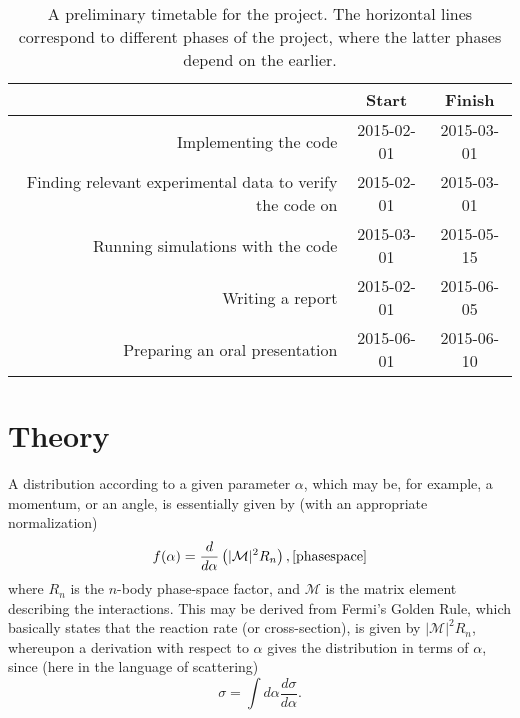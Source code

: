 \documentclass[12pt, a4paper]{article}
\newcommand{\me}{\ensuremath{\mathcal{M}}}
\begin{document}
\begin{table}
\centering
\caption{\label{timetable} A preliminary timetable for the project. The horizontal lines correspond to different phases of the project, where the latter phases depend on the earlier.}
\begin{tabular}{r|c|c}\hline\hline
& Start & Finish \\\hline
Implementing the code & 2015-02-01 & 2015-03-01 \\
Finding relevant experimental data to verify the code on & 2015-02-01 & 2015-03-01 \\\hline
Running simulations with the code & 2015-03-01 & 2015-05-15 \\
Writing a report &  2015-02-01 & 2015-06-05 \\\hline
Preparing an oral presentation  &  2015-06-01 & 2015-06-10 \\\hline\hline
\end{tabular}
\end{table}



\section{Theory}
\label{t}
A distribution according to a given parameter $\alpha$, which may be, for example, a momentum, or an angle, is essentially given by (with an appropriate normalization)
\begin{equation}
f(\alpha) =\frac{d}{d\alpha} \left(|\me|^2 R_n\right), \cite{phasespace}\label{dist}
\end{equation}
where $R_n$ is the $n$-body phase-space factor, and $\me$ is the matrix element describing the interactions. This may be derived from Fermi's Golden Rule, which basically states that the reaction rate (or cross-section), is given by $|\me|^2 R_n$, whereupon a derivation with respect to $\alpha$ gives the distribution in terms of $\alpha$, since (here in the language of scattering)
\begin{equation}
\sigma = \int d\alpha \frac{d\sigma}{d\alpha}.
\end{equation}
\end{document}
